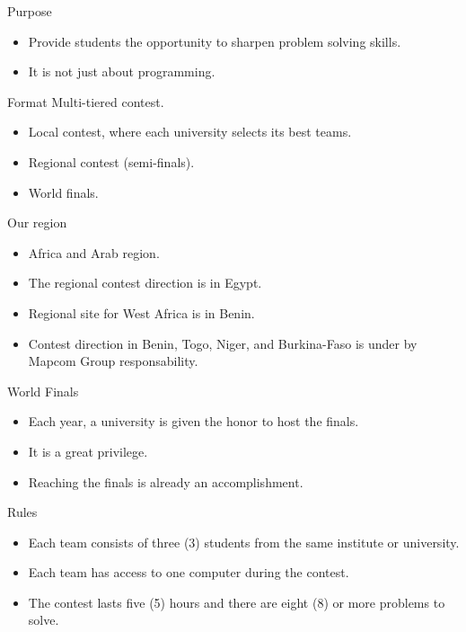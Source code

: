 \documentclass{beamer}
\begin{document}
\begin{frame}{Purpose}
\begin{itemize}
  \justifying
  \item Provide students the opportunity to sharpen problem solving skills.
  \item It is not just about programming.  
\end{itemize}
\end{frame}

\begin{frame}{Format}
Multi-tiered contest.
\begin{itemize}
  \justifying
  \item Local contest, where each university selects its best teams.
  \item Regional contest (semi-finals).
  \item World finals.
\end{itemize}
\end{frame}

\begin{frame}{Our region}
\begin{itemize}
  \justifying
  \item Africa and Arab region.
  \item The regional contest direction is in Egypt.
  \item Regional site for West Africa is in Benin.
  \item Contest direction in Benin, Togo, Niger, and Burkina-Faso is under by Mapcom Group responsability.
\end{itemize}
\end{frame}

\begin{frame}{World Finals}
\begin{itemize}
  \justifying
  \item Each year, a university is given the honor to host the finals.
  \item It is a great privilege.
  \item Reaching the finals is already an accomplishment.
\end{itemize}
\end{frame}

\begin{frame}{Rules}
\begin{itemize}
  \justifying
  \item Each team consists of three (3) students from the same institute or university.
  \item Each team has access to one computer during the contest.
  \item The contest lasts five (5) hours and there are eight (8) or more problems to solve.
\end{itemize}
\end{frame}
\end{document}
